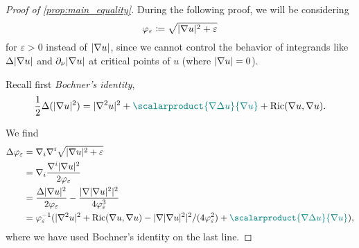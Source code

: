 \documentclass[draft]{amsart}
\newcommand*{\mathcomma}{,}
\newcommand*{\mathfullstop}{.}
\newcommand*{\definedas}{\coloneqq}
\newcommand*{\laplacian}{\Delta}
\DeclarePairedDelimiter{\abs}{\lvert}{\rvert} %
\newcommand{\Ricci}{\mathrm{Ric}} %
\begin{document}
\begin{proof}[Proof of \cref{prop:main_equality}]
    During the following proof, we will be considering 
    \begin{equation*}
        \varphi_\varepsilon\definedas \sqrt{\abs{\nabla u}^2+\varepsilon} 
    \end{equation*}
    for \( \varepsilon>0 \) instead of \( \abs{\nabla u} \), since we cannot control the behavior of integrands like \( \laplacian \abs{\nabla u} \) and \( \partial_\nu \abs{\nabla u} \) at critical points of \( u \) (where \( \abs{\nabla u}=0 \)).

    Recall first \emph{Bochner's identity},
    \begin{equation*}
        \frac{1}{2}\laplacian(\abs{\nabla u}^2)=\abs{\nabla^2 u}^2+\nonHarmonic{\scalarproduct{\nabla \laplacian u}{\nabla u}}+\Ricci(\nabla u, \nabla u)\mathfullstop
    \end{equation*} 

    We find
    \begin{equation}\label{eq:main_equality_applied_bochner}
        \begin{aligned}[b]
            \laplacian \varphi_\varepsilon&=\nabla_i \nabla^i \sqrt{\abs{\nabla u}^2+\varepsilon}\\
            &=\nabla_i \frac{\nabla^i \abs{\nabla u}^2}{2\varphi_\varepsilon}\\
            &=\frac{\laplacian \abs{\nabla u}^2}{2\varphi_\varepsilon}-\frac{\abs{\nabla\abs{\nabla u}^2}^2}{4\varphi_\varepsilon^3}\\
            &=\varphi_{\varepsilon}^{-1}(\abs{\nabla^2 u}^2+\Ricci(\nabla u,\nabla u)-\abs{\nabla \abs{\nabla u}^2}^2/(4\varphi_\varepsilon^2)+\nonHarmonic{\scalarproduct{\nabla \laplacian u}{\nabla u}})\mathcomma
        \end{aligned}
    \end{equation}
    where we have used Bochner's identity on the last line.


\end{proof}
\end{document}
